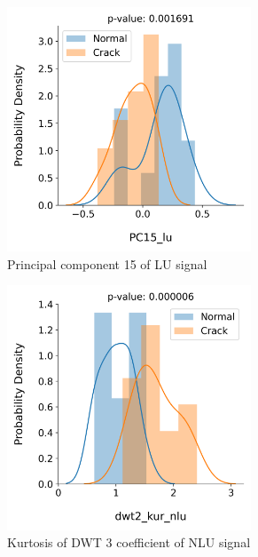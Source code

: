 \begin{figure}[tb]
  \begin{subfigure}[t]{0.49\linewidth}
    \centering
    \includegraphics[width=0.8\textwidth]{fig/crack_detection_PC15_lu.png}
    \caption{Principal component 15 of LU signal}
  \end{subfigure}
  \begin{subfigure}[t]{0.49\linewidth}
    \centering
    \includegraphics[width=0.8\textwidth]{fig/crack_detection_dwt2_kur_nlu.png}
    \caption{Kurtosis of DWT 3 coefficient of NLU signal}
  \end{subfigure}
  \begin{subfigure}[t]{0.49\linewidth}

\end{subfigure}
\end{figure}
